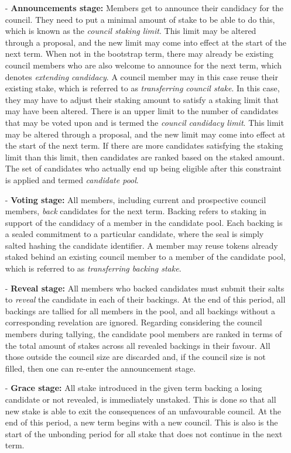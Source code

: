 \documentclass{article}
\begin{document}
\begin{itemize}

\item[-] \textbf{Announcements stage:} Members get to announce their candidacy for the council. They need to put a minimal amount of stake to be able to do this, which is known as the \textit{council staking limit}. This limit may be altered through a proposal, and the new limit may come into effect at the start of the next term. When not in the bootstrap term, there may already be existing council members who are also welcome to announce for the next term, which denotes \textit{extending candidacy}. A council member may in this case reuse their existing stake, which is referred to as \textit{transferring council stake}. In this case, they may have to adjust their staking amount to satisfy a staking limit that may have been altered. There is an upper limit to the number of candidates that may be voted upon and is termed the \textit{council candidacy limit}. This limit may be altered through a proposal, and the new limit may come into effect at the start of the next term. If there are more candidates satisfying the staking limit than this limit, then candidates are ranked based on the staked amount. The set of candidates who actually end up being eligible after this constraint is applied and termed \textit{candidate pool}.

\item[-] \textbf{Voting stage:} All members, including current and prospective council members, \textit{back} candidates for the next term. Backing refers to staking in support of the candidacy of a member in the candidate pool. Each backing is a sealed commitment to a particular candidate, where the seal is simply salted hashing the candidate identifier. A member may reuse tokens already staked behind an existing council member to a member of the candidate pool, which is referred to as \textit{transferring backing stake}.

\item[-] \textbf{Reveal stage:} All members who backed candidates must submit their salts to \textit{reveal} the candidate in each of their backings. At the end of this period, all backings are tallied for all members in the pool, and all backings without a corresponding revelation are ignored. Regarding considering the council members during tallying, the candidate pool members are ranked in terms of the total amount of stakes across all revealed backings in their favour. All those outside the council size are discarded and, if the council size is not filled, then one can re-enter the announcement stage.

\item[-] \textbf{Grace stage:} All stake introduced in the given term backing a losing candidate or not revealed, is immediately unstaked. This is done so that all new stake is able to exit the consequences of an unfavourable council. At the end of this period, a new term begins with a new council. This is also is the start of the unbonding period for all stake that does not continue in the next term.

\end{itemize}
\end{document}
